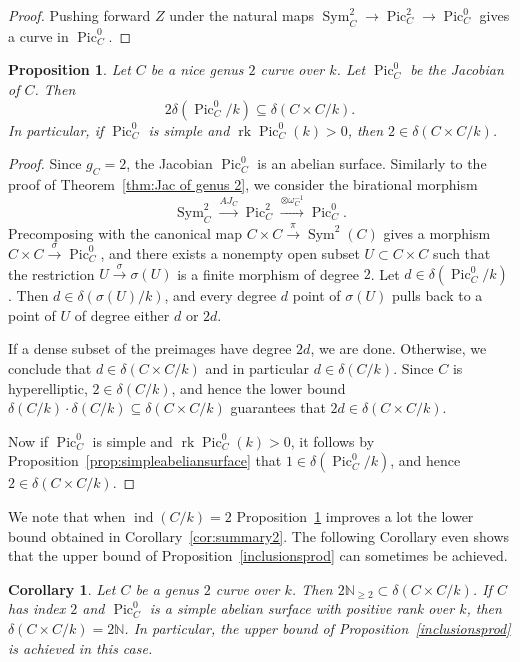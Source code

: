 \documentclass[a4paper,11pt]{amsart}
\theoremstyle{plain}
\newtheorem{coroll}[thm]{Corollary}
\newtheorem{prop}[thm]{Proposition}
\theoremstyle{remark}
\DeclareMathOperator{\Sym}{Sym}
\newcommand{\nn}{\mathbb{N}}
\newcommand{\Pic}{\operatorname{Pic}}
\newcommand{\rk}{\operatorname{rk}}
\newcommand{\dendegs}{\delta}
\newcommand{\ind}{\operatorname{ind}}
\begin{document}
\begin{proof}
    Pushing forward $Z$ under the natural maps $\Sym^2_C \to \Pic^2_C \to \Pic^0_C$ gives a curve in $\Pic^0_C$. 
\end{proof}

\begin{prop}\label{CxC} Let $C$ be a nice genus $2$ curve over $k$. Let $\Pic^0_C$ be the Jacobian of $C$. Then  \[2 \dendegs(\Pic^0_C/k) \subseteq \dendegs(C \times C/k).\] In particular, if \(\Pic^0_C\) is simple and \(\rk \Pic^0_C(k) > 0\), then \(2 \in\dendegs(C \times C/k)\).

\end{prop}
\begin{proof} 
Since $g_C=2$, the Jacobian $\Pic^0_C$ is an abelian surface. 
Similarly to the proof of Theorem~\ref{thm:Jac of genus 2},
we consider the birational morphism 
\[
\Sym^2_C 
\xrightarrow{AJ_C} 
\Pic^2_C \xrightarrow{\otimes \omega_C^{-1}}  
\Pic^0_C.
\]
Precomposing with the canonical map $C\times C\xrightarrow{\pi}\Sym^2(C)$ 
gives a morphism $C\times C\xrightarrow{\sigma} \Pic^0_C$, and there exists a nonempty open subset $U\subset C\times C$ such that the restriction $U\xrightarrow{\sigma} \sigma(U)$ is a finite morphism of degree $2$. 
Let $d\in\dendegs(\Pic^0_C/k)$. 
Then  $d\in\dendegs(\sigma(U)/k)$, and every degree $d$ point of $\sigma(U)$ pulls back to a point of $U$ of degree either $d$ or $2d$. 

If a dense subset of the preimages have degree $2d$, we are done. Otherwise, we conclude that $d\in\dendegs(C\times C/k)$ and in particular $d\in\dendegs(C/k)$. Since $C$ is hyperelliptic, $2\in\dendegs(C/k)$, and hence the lower bound $\dendegs(C/k)\cdot\dendegs(C/k) \subseteq \dendegs(C\times C/k)$ guarantees that $2d\in\dendegs(C\times C/k)$. 

Now if $\Pic^0_C$ is simple and $\rk \Pic^0_C(k)>0$, it follows by Proposition~\ref{prop:simpleabeliansurface} that $1\in\dendegs(\Pic^0_C/k)$, and hence $2\in\dendegs(C\times C/k)$. 
\end{proof} 

We note that when $\ind(C/k)=2$ Proposition~\ref{CxC} improves a lot the lower bound obtained in Corollary~\ref{cor:summary2}. 
The following Corollary even shows that the upper bound of Proposition~\ref{inclusionsprod} can sometimes be achieved.

\begin{coroll}
    Let $C$ be a genus $2$ curve over $k$. Then $2\nn_{\geq 2}\subset \dendegs(C\times C/k)$. 
    If $C$ has index $2$ and $\Pic^0_C$ is a simple abelian surface with positive rank over $k$, then $\dendegs(C\times C/k)=2\nn$. 
    In particular, the upper bound of Proposition~\ref{inclusionsprod} is achieved in this case. 
\end{coroll}
\end{document}
